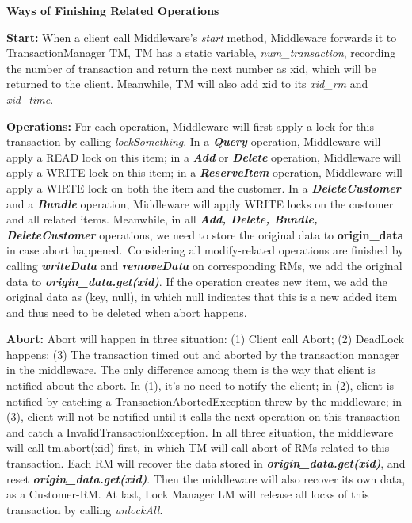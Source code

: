 \documentclass[a4paper, 11pt]{ctexart}
\newcommand{\newPart}[1]{\textbf{\large #1}}
\begin{document}
\newPart{Ways of Finishing Related Operations}

\textbf{Start:} When a client call Middleware's \textit{start} method, Middleware forwards it to TransactionManager TM, TM has a static variable, \textit{num\_transaction}, recording the number of transaction and return the next number as xid, which will be returned to the client. Meanwhile, TM will also add xid to its \textit{xid\_rm} and \textit{xid\_time}.

\textbf{Operations:} For each operation, Middleware will first apply a lock for this transaction by calling \textit{lockSomething}. In a \textbf{\textit{Query}} operation, Middleware will apply a READ lock on this item; in a \textbf{\textit{Add}} or \textbf{\textit{Delete}} operation, Middleware will apply a WRITE lock on this item; in a \textbf{\textit{ReserveItem}} operation, Middleware will apply a WIRTE lock on both the item and the customer. In a \textbf{\textit{DeleteCustomer}} and a \textbf{\textit{Bundle}} operation, Middleware will apply WRITE locks on the customer and all related items. Meanwhile, in all \textbf{\textit{Add, Delete, Bundle, DeleteCustomer}} operations, we need to store the original data to \textbf{origin\_data} in case abort happened. Considering all modify-related operations are finished by calling \textbf{\textit{writeData}} and \textbf{\textit{removeData}} on corresponding RMs, we add the original data to \textbf{\textit{origin\_data.get(xid)}}. If the operation creates new item, we add the original data as (key, null), in which null indicates that this is a new added item and thus need to be deleted when abort happens. 

\textbf{Abort:} Abort will happen in three situation: (1) Client call Abort; (2) DeadLock happens; (3) The transaction timed out and aborted by the transaction manager in the middleware. The only difference among them is the way that client is notified about the abort. In (1), it's no need to notify the client; in (2), client is notified by catching a TransactionAbortedException threw by the middleware; in (3), client will not be notified until it calls the next operation on this transaction and catch a InvalidTransactionException. In all three situation, the middleware will call tm.abort(xid) first, in which TM will call abort of RMs related to this transaction. Each RM will recover the data stored in \textbf{\textit{origin\_data.get(xid)}}, and reset \textbf{\textit{origin\_data.get(xid)}}. Then the middleware will also recover its own data, as a Customer-RM. At last, Lock Manager LM will release all locks of this transaction by calling \textit{unlockAll}.
\end{document}
